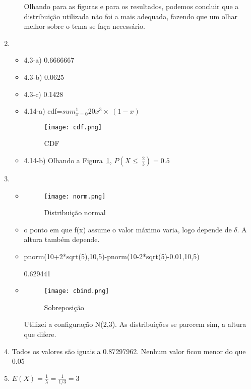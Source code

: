 \documentclass[11pt,a4paper]{book}
\begin{document}
\begin{enumerate}
\begin{itemize}
					Olhando para as figuras e para os resultados, podemos concluir que a distribuição utilizada não foi a mais adequada, fazendo que um olhar melhor sobre o tema se faça necessário.
			\end{itemize}
		\item
			\begin{itemize}
				\item 4.3-a) 0.6666667
				\item 4.3-b) 0.0625
				\item 4.3-c) 0.1428
				\item 4.14-a) cdf=$sum_{x=0}^{1} 20x^{3}\times~(1-x)$
				\begin{figure}[b]
					\centering
					\texttt{[image: cdf.png]}
					\label{fig:cdf}
					\caption{CDF}
				\end{figure}
				\item 4.14-b) Olhando a Figura~\ref{fig:cdf}, $P(X\leq~\frac{2}{3})=0.5$
			\end{itemize}
		\item
			\begin{itemize}
				\item
					\begin{figure}[b]
						\centering
						\texttt{[image: norm.png]}
						\caption{Distribuição normal}
					\end{figure}
				\item o ponto em que f(x) assume o valor máximo varia, logo depende de $\delta$. A altura também depende. 
				\item
					pnorm(10+2*sqrt(5),10,5)-pnorm(10-2*sqrt(5)-0.01,10,5)
				
					0.629441
				\item
					\begin{figure}[t]
						\centering
						\texttt{[image: cbind.png]}
						\caption{Sobreposição}
					\end{figure}
					
					Utilizei a configuração N(2,3).
					As distribuições se parecem sim, a altura que difere.
			\end{itemize}
		\item
			Todos os valores são iguais a 0.87297962.
			Nenhum valor ficou menor do que 0.05
		\item
			$E(X)=\frac{1}{\lambda}=\frac{1}{1/3}=3$
			
	\end{enumerate}
\end{document}
